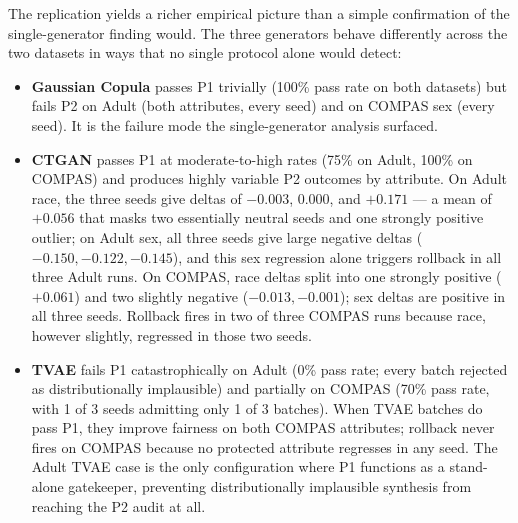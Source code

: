 \documentclass[11pt]{article}
\begin{document}
The replication yields a richer empirical picture than a simple confirmation of the single-generator finding would. The three generators behave differently across the two datasets in ways that no single protocol alone would detect:

\begin{itemize}[leftmargin=*]
\item \textbf{Gaussian Copula} passes P1 trivially (100\% pass rate on both datasets) but fails P2 on Adult (both attributes, every seed) and on COMPAS sex (every seed). It is the failure mode the single-generator analysis surfaced.

\item \textbf{CTGAN} passes P1 at moderate-to-high rates (75\% on Adult, 100\% on COMPAS) and produces highly variable P2 outcomes by attribute. On Adult race, the three seeds give deltas of $-0.003$, 0.000, and $+0.171$ --- a mean of $+0.056$ that masks two essentially neutral seeds and one strongly positive outlier; on Adult sex, all three seeds give large negative deltas ($-0.150, -0.122, -0.145$), and this sex regression alone triggers rollback in all three Adult runs. On COMPAS, race deltas split into one strongly positive ($+0.061$) and two slightly negative ($-0.013, -0.001$); sex deltas are positive in all three seeds. Rollback fires in two of three COMPAS runs because race, however slightly, regressed in those two seeds.

\item \textbf{TVAE} fails P1 catastrophically on Adult (0\% pass rate; every batch rejected as distributionally implausible) and partially on COMPAS (70\% pass rate, with 1 of 3 seeds admitting only 1 of 3 batches). When TVAE batches do pass P1, they improve fairness on both COMPAS attributes; rollback never fires on COMPAS because no protected attribute regresses in any seed. The Adult TVAE case is the only configuration where P1 functions as a stand-alone gatekeeper, preventing distributionally implausible synthesis from reaching the P2 audit at all.
\end{itemize}
\end{document}
